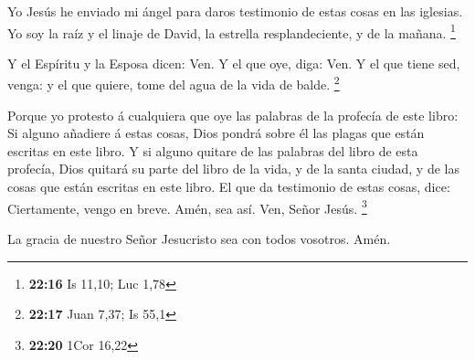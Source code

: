  Yo Jesús he enviado mi ángel para daros testimonio de
estas cosas en las iglesias. Yo soy la raíz y el linaje de David, la
estrella resplandeciente, y de la mañana. \footnote{\textbf{22:16} Is
  11,10; Luc 1,78}

 Y el Espíritu y la Esposa dicen: Ven. Y el que oye, diga:
Ven. Y el que tiene sed, venga: y el que quiere, tome del agua de la
vida de balde. \footnote{\textbf{22:17} Juan 7,37; Is 55,1}

 Porque yo protesto á cualquiera que oye las palabras de la
profecía de este libro: Si alguno añadiere á estas cosas, Dios pondrá
sobre él las plagas que están escritas en este libro.  Y si
alguno quitare de las palabras del libro de esta profecía, Dios quitará
su parte del libro de la vida, y de la santa ciudad, y de las cosas que
están escritas en este libro.  El que da testimonio de
estas cosas, dice: Ciertamente, vengo en breve. Amén, sea así. Ven,
Señor Jesús. \footnote{\textbf{22:20} 1Cor 16,22}

 La gracia de nuestro Señor Jesucristo sea con todos
vosotros. Amén.
